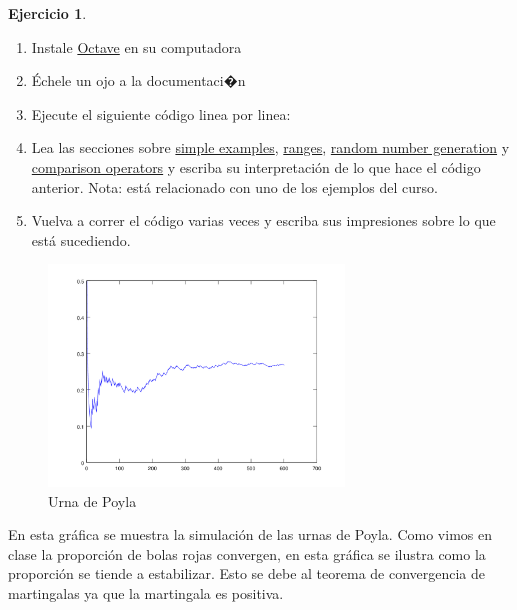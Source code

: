 \documentclass[a5paper,oneside]{amsart}
\theoremstyle{plain}
\theoremstyle{definition}
\newtheorem{ejercicio}{Ejercicio}
\begin{document}
\begin{ejercicio}\mbox{}
\begin{enumerate}
\item Instale \href{www.octave.org}{Octave} en su computadora
\item \'Echele un ojo a la documentaci�n
\item Ejecute el siguiente c\'odigo linea por linea:
\item Lea las secciones sobre \href{http://www.gnu.org/software/octave/doc/interpreter/Simple-Examples.html#Simple-Examples}{simple examples}, \href{http://www.gnu.org/software/octave/doc/interpreter/Ranges.html#Ranges}{ranges}, \href{http://www.gnu.org/software/octave/doc/interpreter/Random-Number-Generation.html#Random-Number-Generation}{random number generation} y \href{http://www.gnu.org/software/octave/doc/interpreter/Comparison-Ops.html#Comparison-Ops}{comparison operators} y escriba su interpretaci\'on de lo que hace el c\'odigo anterior. Nota: est\'a relacionado con uno de los ejemplos del curso.
\item Vuelva a correr el c\'odigo varias veces y escriba sus impresiones sobre lo que est\'a sucediendo.
\end{enumerate}

\begin{figure}
\centering
\includegraphics[width=0.7\textwidth]{poyla.png}
\caption{Urna de Poyla}
\label{Urna de Poyla}
\end{figure}


En esta gr\'afica se muestra la simulaci\'on de las urnas de Poyla. Como vimos en clase la proporci\'on de bolas rojas convergen, en esta gr\'afica se ilustra como la proporci\'on se tiende a estabilizar. Esto se debe al teorema de convergencia de martingalas ya que la martingala es positiva.

\end{ejercicio}
\end{document}

